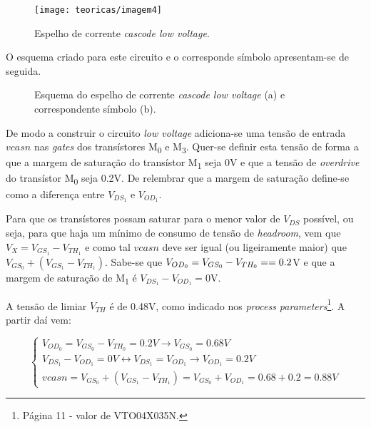 \documentclass[11pt]{article}
\numberwithin{equation}{section}
\begin{document}
\begin{figure}[H]
	\centering
	\texttt{[image: teoricas/imagem4]}
	\vspace{-0.8em}
	\caption{Espelho de corrente \textit{cascode low voltage}.}
	\vspace{-0.8em}
\end{figure}

O esquema criado para este circuito e o corresponde símbolo apresentam-se de seguida.

\begin{figure}[H]
	\centering
	\hspace{2mm}
	\vspace{-0.8em}
	\caption{Esquema do espelho de corrente \textit{cascode low voltage} (a) e correspondente símbolo (b).}
	\vspace{-0.8em}
\end{figure}

De modo a construir o circuito \textit{low voltage} adiciona-se uma tensão de entrada $vcasn$ nas \textit{gates} dos transístores M\textsubscript{0} e  M\textsubscript{3}. Quer-se definir esta tensão de forma a que a margem de saturação do transístor M\textsubscript{1} seja 0V e que a tensão de \textit{overdrive} do transístor M\textsubscript{0} seja 0.2V. De relembrar que a margem de saturação define-se como a diferença entre $V_{DS_{1}}$ e $V_{OD_{1}}$.

Para que os transístores possam saturar para o menor valor de $V_{DS}$ possível, ou seja, para que haja um mínimo de consumo de tensão de \textit{headroom}, vem que $V_{X} = V_{GS_{1}} - V_{TH_{1}}$ e como tal $vcasn$ deve ser igual (ou ligeiramente maior) que $V_{GS_{0}}+(V_{GS_{1}} - V_{TH_{1}})$. Sabe-se que $V_{OD_{0}} = V_{GS_{0}} - V_{TH_{0}} = \linebreak = 0.2$V e que a margem de saturação de M\textsubscript{1} é $V_{DS_{1}}-V_{OD_{1}} = 0$V.

A tensão de limiar $V_{TH}$ é de 0.48V, como indicado nos \textit{process parameters}\footnote{Página 11 - valor de VTO04X035N.}. A partir daí vem:

\vspace{-0.8em}

\begin{equation}
\begin{cases} V_{OD_{0}} = V_{GS_{0}} - V_{TH_{0}} = 0.2 V \rightarrow V_{GS_{0}} = 0.68V \\ V_{DS_{1}} - V_{OD_{1}} = 0 V \leftrightarrow V_{DS_{1}} = V_{OD_{1}} \rightarrow V_{OD_{1}} = 0.2V \\ vcasn = V_{GS_{0}} + (V_{GS_{1}} - V_{TH_{1}}) = V_{GS_{0}} +  V_{OD_{1}} = 0.68 + 0.2 = 0.88V \end{cases}
\end{equation}
\end{document}
